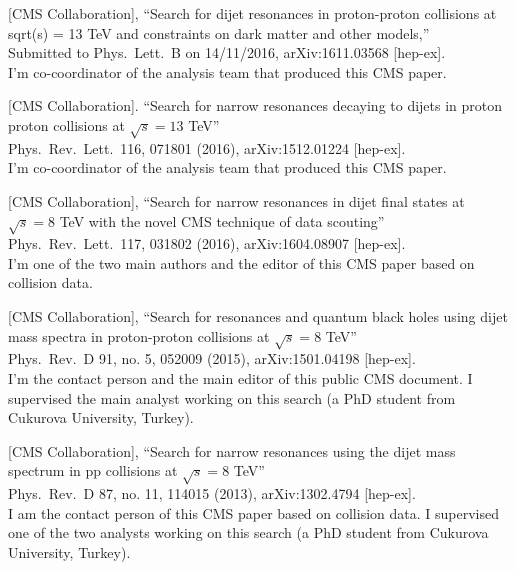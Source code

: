 \documentclass[10pt, a4paper]{article}
\begin{document}
\clearpage


\begin{thebibliography}{599}

  [CMS Collaboration],
  ``Search for dijet resonances in proton-proton collisions at sqrt(s) = 13 TeV and constraints on dark matter and other models,''\\
  Submitted to Phys.\ Lett.\ B on 14/11/2016, arXiv:1611.03568 [hep-ex].\\
  I'm co-coordinator of the analysis team that produced this CMS paper.
 
  [CMS Collaboration].
  ``Search for narrow resonances decaying to  dijets in proton
    proton collisions at $\sqrt{s}=13$ TeV''\\
  Phys.\ Rev.\ Lett.\  116, 071801 (2016), arXiv:1512.01224 [hep-ex].\\
I'm co-coordinator of the analysis team that produced this CMS paper.

[CMS Collaboration],
  ``Search for narrow resonances in dijet final states at $\sqrt{s}=8$
  TeV with the novel CMS technique of data scouting''\\
  Phys.\ Rev.\ Lett.\  117, 031802 (2016), arXiv:1604.08907 [hep-ex].
\\I'm one of the two main authors and the editor of this CMS paper based on
collision data.

  [CMS Collaboration],
  ``Search for resonances and quantum black holes using dijet mass
  spectra in proton-proton collisions at $\sqrt{s}=8$ TeV''\\
  Phys.\ Rev.\ D 91, no. 5, 052009 (2015), arXiv:1501.04198 [hep-ex].
  \\I'm the contact person and the main editor of this public CMS document. I supervised the main analyst working on this search (a PhD student from Cukurova University, Turkey).

[CMS Collaboration],
 ``Search for narrow resonances using the dijet mass spectrum in pp collisions at $\sqrt{s}=8$ TeV''\\
Phys.\ Rev.\ D 87, no. 11, 114015 (2013), arXiv:1302.4794 [hep-ex].
 \\ I am the contact person of this CMS paper based on collision data. I supervised one of the two analysts working on this search (a PhD student from Cukurova University, Turkey).  


\end{thebibliography}
\end{document}
